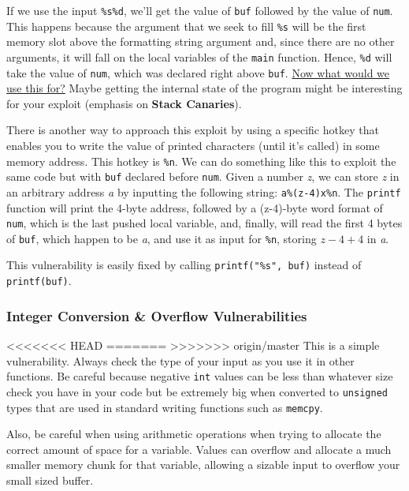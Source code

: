 \documentclass[11pt]{article}
\begin{document}
If we use the input \texttt{\%s\%d}, we'll get the value of \texttt{buf} followed by the value of \texttt{num}. This happens because the argument that we seek to fill \texttt{\%s} will be the first memory slot above the formatting string argument and, since there are no other arguments, it will fall on the local variables of the \texttt{main} function. Hence, \texttt{\%d} will take the value of \texttt{num}, which was declared right above \texttt{buf}. \uline{Now what would we use this for?} Maybe getting the internal state of the program might be interesting for your exploit (emphasis on \textbf{Stack Canaries}).

There is another way to approach this exploit by using a specific hotkey that enables you to write the value of printed characters (until it's called) in some memory address. This hotkey is \texttt{\%n}. We can do something like this to exploit the same code but with \texttt{buf} declared before \texttt{num}. Given a number \emph{z}, we can store \emph{z} in an arbitrary address \emph{a} by inputting the following string: \texttt{a\%(z-4)x\%n}. The \texttt{printf} function will print the 4-byte address, followed by a (z-4)-byte word format of \texttt{num}, which is the last pushed local variable, and, finally, will read the first 4 bytes of \texttt{buf}, which happen to be \emph{a}, and use it as input for \texttt{\%n}, storing \(z - 4 + 4\) in \emph{a}.  

This vulnerability is easily fixed by calling \texttt{printf("\%s", buf)} instead of \texttt{printf(buf)}.
\subsubsection{Integer Conversion \& Overflow Vulnerabilities}
<<<<<<< HEAD
\label{sec:org6222502}
=======
\label{sec:org0f0a2e7}
>>>>>>> origin/master
This is a simple vulnerability. Always check the type of your input as you use it in other functions. Be careful because negative \texttt{int} values can be less than whatever size check you have in your code but be extremely big when converted to \texttt{unsigned} types that are used in standard writing functions such as \texttt{memcpy}.

Also, be careful when using arithmetic operations when trying to allocate the correct amount of space for a variable. Values can overflow and allocate a much smaller memory chunk for that variable, allowing a sizable input to overflow your small sized buffer.
\end{document}
